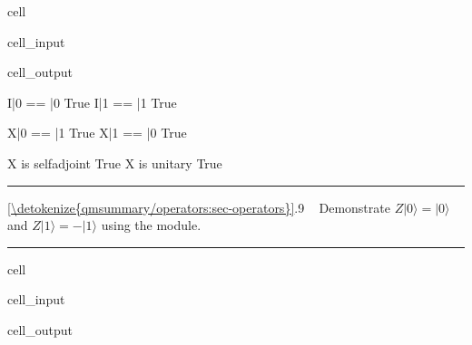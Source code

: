 \documentclass[letterpaper,10pt,english]{jupyterBook}
\begin{document}
\begin{sphinxuseclass}{cell}
\begin{sphinxVerbatimInput}
\begin{sphinxuseclass}{cell_input}
\end{sphinxuseclass}\end{sphinxVerbatimInput}
\begin{sphinxVerbatimOutput}

\begin{sphinxuseclass}{cell_output}
\begin{sphinxVerbatim}[commandchars=\\\{\}]
I|0\PYGZgt{} == |0\PYGZgt{}  True
I|1\PYGZgt{} == |1\PYGZgt{}  True

X|0\PYGZgt{} == |1\PYGZgt{}  True
X|1\PYGZgt{} == |0\PYGZgt{}  True

X is self\PYGZhy{}adjoint  True
X is unitary  True
\end{sphinxVerbatim}

\end{sphinxuseclass}\end{sphinxVerbatimOutput}

\end{sphinxuseclass}

\bigskip\hrule\bigskip


\sphinxAtStartPar
{} \hyperref[\detokenize{qmsummary/operators:sec-operators}]{\ref{\detokenize{qmsummary/operators:sec-operators}}}.9     Demonstrate \(Z|0\rangle=|0\rangle\) and \(Z|1\rangle=-|1\rangle\) using the  module.


\bigskip\hrule\bigskip


\begin{sphinxuseclass}{cell}\begin{sphinxVerbatimInput}

\begin{sphinxuseclass}{cell_input}
\begin{sphinxVerbatim}[commandchars=\\\{\}]
   
\end{sphinxVerbatim}

\end{sphinxuseclass}\end{sphinxVerbatimInput}
\begin{sphinxVerbatimOutput}

\begin{sphinxuseclass}{cell_output}
\noindent{}

\end{sphinxuseclass}\end{sphinxVerbatimOutput}

\end{sphinxuseclass}
\end{document}
